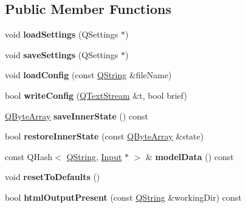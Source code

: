\subsection*{Public Member Functions}
\begin{DoxyCompactItemize}
\item 
\mbox{\label{class_expert_a6699bfc81c493bb4f7ac8985ae57a9cc}} 
void {\bfseries load\+Settings} (Q\+Settings $\ast$)
\item 
\mbox{\label{class_expert_ac7bcc765c191acd4e2af1560115cb70a}} 
void {\bfseries save\+Settings} (Q\+Settings $\ast$)
\item 
\mbox{\label{class_expert_a072a019d46bd7a9b4eb92fb0ca86b5b7}} 
void {\bfseries load\+Config} (const \mbox{\hyperlink{class_q_string}{Q\+String}} \&file\+Name)
\item 
\mbox{\label{class_expert_a4bc35e5cb24bb095511bd8cdc7f415b7}} 
bool {\bfseries write\+Config} (\mbox{\hyperlink{class_q_text_stream}{Q\+Text\+Stream}} \&t, bool brief)
\item 
\mbox{\label{class_expert_ad8a25b3f1560dc325a788df3b9cfdae3}} 
\mbox{\hyperlink{class_q_array}{Q\+Byte\+Array}} {\bfseries save\+Inner\+State} () const
\item 
\mbox{\label{class_expert_acfcc32d46839257f85dd9fd0e346b62d}} 
bool {\bfseries restore\+Inner\+State} (const \mbox{\hyperlink{class_q_array}{Q\+Byte\+Array}} \&state)
\item 
\mbox{\label{class_expert_af00a1945b86ddb66aa63bd65ee8db94e}} 
const Q\+Hash$<$ \mbox{\hyperlink{class_q_string}{Q\+String}}, \mbox{\hyperlink{class_input}{Input}} $\ast$ $>$ \& {\bfseries model\+Data} () const
\item 
\mbox{\label{class_expert_a7c5287712acfe6451563bdc7f17e9ef6}} 
void {\bfseries reset\+To\+Defaults} ()
\item 
\mbox{\label{class_expert_ad46c2f342c6ced7cc3ee21a3e59bc37b}} 
bool {\bfseries html\+Output\+Present} (const \mbox{\hyperlink{class_q_string}{Q\+String}} \&working\+Dir) const
\item 

\end{DoxyCompactItemize}
